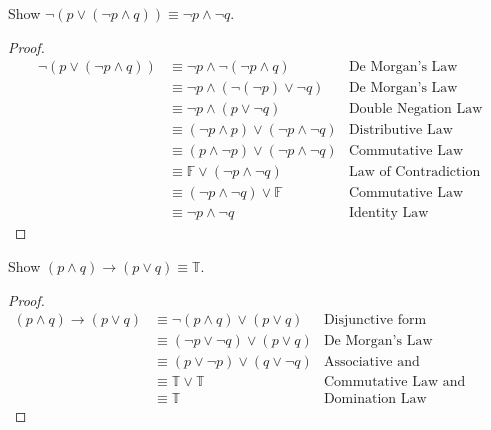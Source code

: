 \begin{exmp}
\label{exmp:formalproof1}
Show $\lnot(p\lor(\lnot p\land q))\equiv \lnot p\land\lnot q$. %
\begin{proof}
\begin{align*}
\lnot(p\lor(\lnot p\land q))
&\equiv \lnot p \land \lnot(\lnot p\land q)         &\text{De Morgan's Law}\\
&\equiv \lnot p \land (\lnot(\lnot p)\lor\lnot q)   &\text{De Morgan's Law}\\
&\equiv \lnot p\land(p\lor\lnot q)                  &\text{Double Negation Law}\\
&\equiv (\lnot p\land p)\lor(\lnot p\land \lnot q)  &\text{Distributive Law}\\
&\equiv ( p\land \lnot p)\lor(\lnot p\land \lnot q) &\text{Commutative Law}\\
&\equiv \mathbb{F} \lor (\lnot p \land \lnot q)     &\text{Law of Contradiction}\\
&\equiv  (\lnot p \land \lnot q)\lor\mathbb{F}      &\text{Commutative Law}\\
&\equiv \lnot p\land\lnot q                         &\text{Identity Law}
\end{align*}

\end{proof}
\end{exmp}

\clearpage
\begin{exmp}
\label{exmp:formalproof2}
Show $(p\land q)\to(p\lor q)\equiv\mathbb{T}$.

\begin{proof}
\begin{align*}
(p\land q)\to(p\lor q)
&\equiv\lnot(p\land q)\lor(p\lor q)         &\text{Disjunctive form}\\
&\equiv (\lnot p\lor\lnot q)\lor(p\lor q)   &\text{De Morgan's Law}\\
&\equiv (p\lor \lnot p)\lor(q \lor \lnot q) &\text{Associative and Commutative Laws}\\
&\equiv \mathbb{T}\lor\mathbb{T}            &\text{Commutative Law and Excluded Middle}\\
&\equiv \mathbb{T}                          &\text{Domination Law}
\end{align*}
\end{proof}

\end{exmp}


